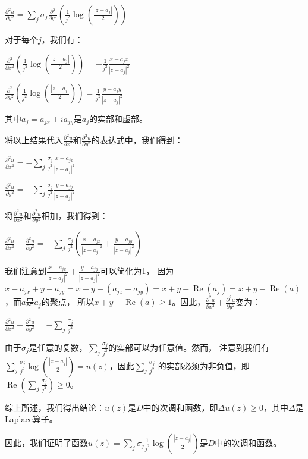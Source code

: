 \documentclass[12pt, a4paper, oneside]{article}
\begin{document}
\begin{spacing}{2.0}
\begin{center}
    $\frac{\partial^2u}{\partial y^2}=\sum_j\sigma_j\frac{\partial^2}{\partial y^2}\left(\frac{1}{j^2}\log\left(\frac{|z-a_j|}{2}\right)\right)$
\end{center}
对于每个$j$，我们有：
\begin{center}
    $\frac{\partial^2}{\partial x^2}\left(\frac{1}{j^2}\log\left(\frac{|z-a_j|}{2}\right)\right)=-\frac{1}{j^2}\frac{x-a_jx}{|z-a_j|^2}$
\end{center}
\begin{center}

    $\frac{\partial^2}{\partial y^2}\left(\frac{1}{j^2}\log\left(\frac{|z-a_j|}{2}\right)\right)=\frac{1}{j^2}\frac{y-a_j y}{|z-a_j|^2}$

\end{center}
其中$a_j = a_{jx}+ia_{jy}$是$a_j$的实部和虚部。

将以上结果代入$\frac{\partial^2 u}{\partial x^2}$和$\frac{\partial^2 u}{\partial y^2}$的表达式中，我们得到：
\begin{center}
    $\frac{\partial^2u}{\partial x^2} = -\sum_j\frac{\sigma_j}{j^2}\frac{x-a_{jx}}{|z-a_j|^2}$
\end{center}

\begin{center}
    $\frac{\partial^2u}{\partial y^2} = -\sum_j\frac{\sigma_j}{j^2}\frac{y-a_{jy}}{|z-a_j|^2}$
\end{center}
将$\frac{\partial^2 u}{\partial x^2}$和$\frac{\partial^2 u}{\partial y^2}$相加，我们得到：

\begin{center}
    $\frac{\partial^2u}{\partial x^2}+\frac{\partial^2u}{\partial y^2}=-\sum_j\frac{\sigma_j}{j^2}\left(\frac{x-a_{jx}}{|z-a_j|^2}+\frac{y-a_{jy}}{|z-a_j|^2}\right)$
\end{center}

我们注意到$\frac{x-a_{jx}}{|z-a_j|^2} + \frac{y-a_{jy}}{|z-a_j|^2}$可以简化为1，
因为$x-a_{jx}+y-a_{jy}=x+y-(a_{jx}+a_{jy})=x+y-\operatorname{Re}(a_j)=x+y-\operatorname{Re}(a)$，而$a$是$a_j$的聚点，
所以$x+y-\operatorname{Re}(a) \geq 1$。因此，$\frac{\partial^2 u}{\partial x^2} + \frac{\partial^2 u}{\partial y^2}$变为：

\begin{center}
    $\frac{\partial^2u}{\partial x^2}+\frac{\partial^2u}{\partial y^2}=-\sum_j\frac{\sigma_j}{j^2}$
\end{center}
由于$\sigma_j$是任意的复数，$\sum_{j}\frac{\sigma_j}{j^2}$的实部可以为任意值。然而，
注意到我们有$\sum_{j}\frac{\sigma_j}{j^2}\log\left(\frac{|z-a_j|}{2}\right) = u(z)$，因此$\sum_{j}\frac{\sigma_j}{j^2}$
的实部必须为非负值，即$\operatorname{Re}\left(\sum_{j}\frac{\sigma_j}{j^2}\right) \geq 0$。

综上所述，我们得出结论：$u(z)$是$D$中的次调和函数，即$\Delta u(z) \geq 0$，其中$\Delta$是Laplace算子。

因此，我们证明了函数$u(z) = \sum_{j}\sigma_j \frac{1}{j^2}\log\left(\frac{|z-a_j|}{2}\right)$是$D$中的次调和函数。




\end{spacing}{}
\end{document}
